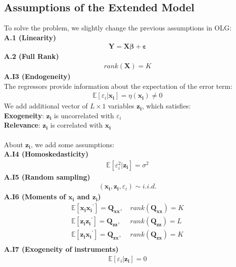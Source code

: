 \documentclass{article}
\begin{document}
\subsection{Assumptions of the Extended Model}
To solve the problem, we slightly change the previous assumptions in OLG:\\
\textbf{A.1 (Linearity)}
	\begin{align*}
		\boldsymbol{Y} = \boldsymbol{X} \boldsymbol{\beta} + \boldsymbol{\varepsilon}
	\end{align*}
\textbf{A.2 (Full Rank)}
	\begin{align*}
		rank(\boldsymbol{X}) = K
	\end{align*}
\textbf{A.I3 (Endogeneity)}\\
The regressors provide information about the expectation of the error term:
	\begin{align*}
		\mathbb{E}[\varepsilon_i | \boldsymbol{x_i}] = \eta(\boldsymbol{x_i}) \neq 0
	\end{align*}
We add additional vector of $L \times 1$ variables $\boldsymbol{z_i}$, which satisfies:\\
\indent \textbf{Exogeneity}: $\boldsymbol{z_i}$ is uncorrelated with $\varepsilon_i$\\
\indent \textbf{Relevance}: $\boldsymbol{z_i}$ is correlated with $\boldsymbol{x_i}$\\\\
About $\boldsymbol{z_i}$, we add some assumptions:\\
\textbf{A.I4 (Homoskedasticity)}
	\begin{align*}
		\mathbb{E}[\varepsilon^2_i | \boldsymbol{z_i}] = \sigma^2
	\end{align*}
\textbf{A.I5 (Random sampling)}
	\begin{align*}
		(\boldsymbol{x_i}, \boldsymbol{z_i}, \varepsilon_i) \sim i.i.d.
	\end{align*}
\textbf{A.I6 (Moments of $\boldsymbol{x_i}$ and $\boldsymbol{z_i}$)}
	\begin{align*}
		\mathbb{E}[\boldsymbol{x_i} \boldsymbol{x_i}^\prime] = \boldsymbol{Q_{xx}},&\ rank(\boldsymbol{Q_{xx}}) = K\\
		\mathbb{E}[\boldsymbol{z_i} \boldsymbol{z_i}^\prime] = \boldsymbol{Q_{zz}},&\ rank(\boldsymbol{Q_{zz}}) = L\\
		\mathbb{E}[\boldsymbol{z_i} \boldsymbol{x_i}^\prime] = \boldsymbol{Q_{zx}},&\ rank(\boldsymbol{Q_{zx}}) = K\\
	\end{align*}	
\textbf{A.I7 (Exogeneity of instruments)}
	\begin{align*}
		\mathbb{E}[\varepsilon_i | \boldsymbol{z_i}] = 0
	\end{align*}
\end{document}
